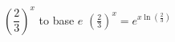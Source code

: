 {$\left(\dfrac{2}{3}\right)^{x}$ to base $e$}
{$\left(\frac{2}{3}\right)^{x} = e^{x\ln(\frac{2}{3})}$}

